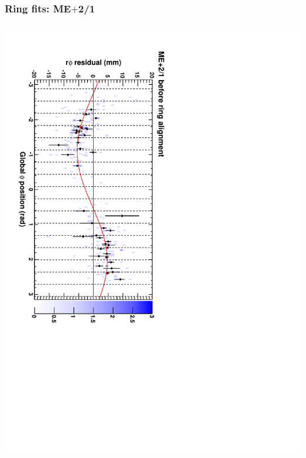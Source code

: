 \documentclass[compress]{beamer}
\begin{document}
\begin{frame}
\frametitle{Ring fits: ME$+$2/1}
\vfill
\begin{columns}
\includegraphics[height=\linewidth, angle=90]{ringfits_before/mep21.pdf}


\end{columns}
\end{frame}
\end{document}
